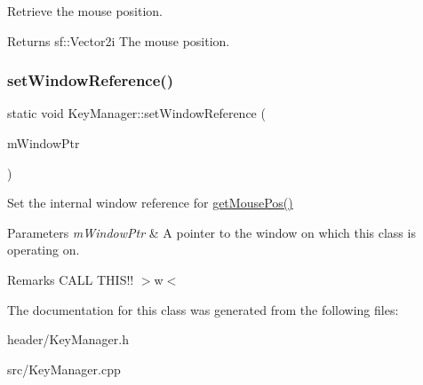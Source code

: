 Retrieve the mouse position. 

\begin{DoxyReturn}{Returns}
sf\+::\+Vector2i The mouse position. 
\end{DoxyReturn}
\mbox{\label{class_key_manager_acb062eff198aaa23e63cf07763e6b9ae}} 
\subsubsection{\texorpdfstring{set\+Window\+Reference()}{setWindowReference()}}
{\footnotesize\ttfamily static void Key\+Manager\+::set\+Window\+Reference (\begin{DoxyParamCaption}\item[{sf\+::\+Render\+Window $\ast$}]{m\+Window\+Ptr }\end{DoxyParamCaption})\hspace{0.3cm}{\ttfamily [static]}}



Set the internal window reference for \mbox{\hyperlink{class_key_manager_aae40b808bf243100e3da7e63fb8cebe5}{get\+Mouse\+Pos()}} 


\begin{DoxyParams}{Parameters}
{\em m\+Window\+Ptr} & A pointer to the window on which this class is operating on.\\
\hline
\end{DoxyParams}
\begin{DoxyRemark}{Remarks}
C\+A\+LL T\+H\+I\+S!! $>$w$<$ 
\end{DoxyRemark}


The documentation for this class was generated from the following files\+:\begin{DoxyCompactItemize}
\item 
header/Key\+Manager.\+h\item 
src/Key\+Manager.\+cpp\end{DoxyCompactItemize}

